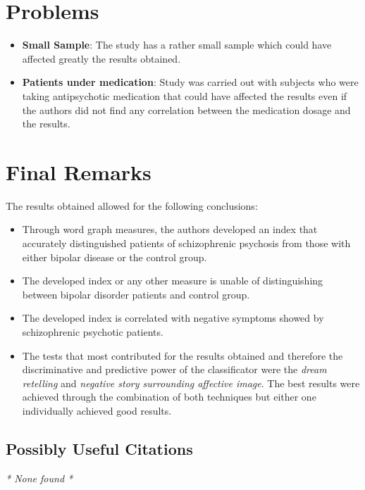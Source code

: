 \documentclass{Paper_Summary}
\begin{document}
\section{Problems}
    \begin{itemize}
        \item \textbf{Small Sample}: The study has a rather small sample which could have affected greatly the results obtained.
        \item \textbf{Patients under medication}: Study was carried out with subjects who were taking antipsychotic medication that could have affected the results even if the authors did not find any correlation between the medication dosage and the results.
        
    \end{itemize}


\section{Final Remarks}
    
    The results obtained allowed for the following conclusions:
    \begin{itemize}
        \item Through word graph measures, the authors developed an index that accurately distinguished patients of schizophrenic psychosis from those with either bipolar disease or the control group.
        \item The developed index or any other measure is unable of distinguishing between bipolar disorder patients and control group.
        \item The developed index is correlated with negative symptoms showed by schizophrenic psychotic patients.
        \item The tests that most contributed for the results obtained and therefore the discriminative and predictive power of the classificator were the \emph{dream retelling} and \emph{negative story surrounding affective image}. The best results were achieved through the combination of both techniques but either one individually achieved good results.
    \end{itemize}

\breakline

\begin{center}
    \section*{Possibly Useful Citations}
\end{center}
\emph{* None found *}
\end{document}
